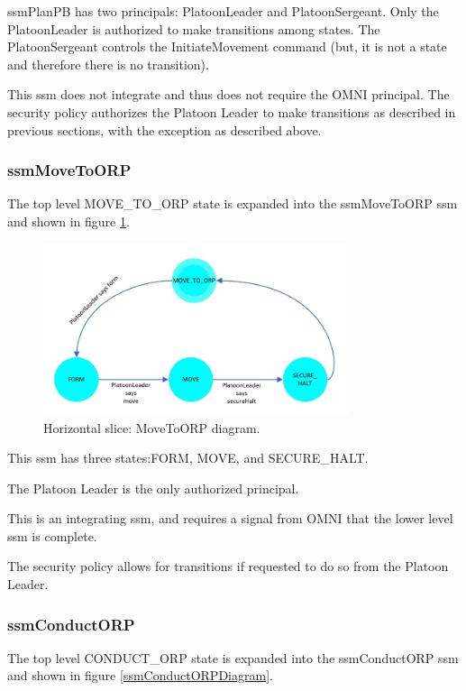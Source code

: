 \documentclass[../../main/main.tex]{subfiles}
\begin{document}
ssmPlanPB has two principals: PlatoonLeader and PlatoonSergeant.  Only the PlatoonLeader is authorized to make transitions among states.  The PlatoonSergeant controls the InitiateMovement command (but, it is not a state and therefore there is no transition).

This \gls{ssm} does not integrate and thus does not require the OMNI principal.  The security policy authorizes the Platoon Leader to make transitions as described in previous sections, with the exception as described above.  


\clearpage
\subsubsection{ssmMoveToORP}\label{sssec:ssmMoveToORP}
The top level MOVE_TO_ORP state is expanded into the ssmMoveToORP \gls{ssm} and shown in figure \ref{ssmMoveToORPDiagram}.

\begin{figure}[!h]
\centering
\includegraphics[width=0.8\textwidth]{../figures/ssmMoveToORPDiagram}
\caption{\label{ssmMoveToORPDiagram} Horizontal slice: MoveToORP diagram.}
\end{figure}

This \gls{ssm} has three states:FORM, MOVE, and SECURE_HALT.  

The Platoon Leader is the only authorized principal.  

This is an integrating \gls{ssm}, and requires a signal from OMNI that the lower level \gls{ssm} is complete.

The security policy allows for transitions if requested to do so from the Platoon Leader.  

\clearpage

\subsubsection{ssmConductORP}\label{sssec:ssmConductORP}
The top level CONDUCT_ORP state is expanded into the ssmConductORP \gls{ssm} and shown in figure \ref{ssmConductORPDiagram}.
\end{document}

